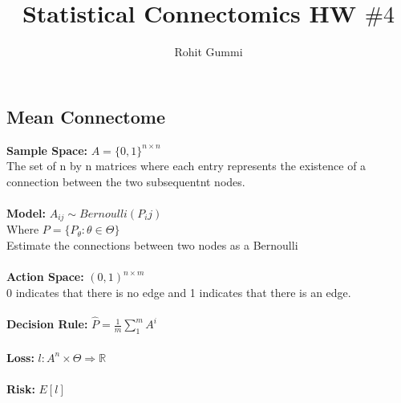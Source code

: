 \documentclass[12pt]{article}
\begin{document}
\title{Statistical Connectomics HW $\#4$}
\author{Rohit Gummi}
\maketitle
\subsection*{Mean Connectome}
\textbf{Sample Space:} $A=\{0,1\}^{n \times n}$
\\The set of n by n matrices where each entry represents the existence of a connection between the two subsequentnt nodes.
\\
\\\textbf{Model:} $A_{ij} \sim Bernoulli(P_ij)$ 
\\Where $P=\{P_\theta : \theta \in \Theta\}$
\\Estimate the connections between two nodes as a Bernoulli
\\
\\\textbf{Action Space:} $(0,1)^{n \times m}$
\\0 indicates that there is no edge and 1 indicates that there is an edge.
\\
\\\textbf{Decision Rule:} $\hat{P}=\frac{1}{m}\sum_1^m A^i$
\\
\\\textbf{Loss:} $l:A^n \times \Theta \Rightarrow \mathbb{R}$
\\
\\\textbf{Risk:} $E[l]$
\end{document}
